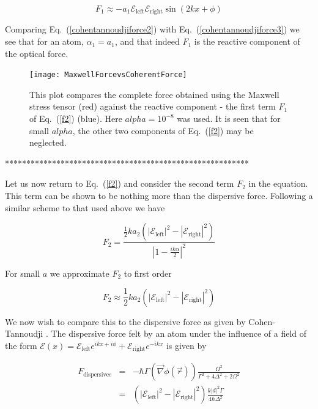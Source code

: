 \documentclass[twocolumn,english,pra,aps,superscriptaddress,floatfix]{revtex4-1}
\begin{document}
\begin{equation}
F_{1}\approx-a_{1} \mathcal{E}_{\mathrm{left}}\mathcal{E}_{\mathrm{right}}\sin\left(2kx+\phi\right)
\label{cohentannoudjiforce3}
\end{equation}

Comparing Eq.\ (\ref{cohentannoudjiforce2}) with Eq.\ (\ref{cohentannoudjiforce3}) we see that for an atom, $\alpha_{1}=a_{1}$, and that indeed $F_{1}$ is the reactive component of the optical force. 

\begin{figure}
\texttt{[image: MaxwellForcevsCoherentForce]}
\caption{This plot compares the complete force obtained using the Maxwell stress tensor (red) against the reactive component - the first term $F_{1}$ of Eq.\ (\ref{f2}) (blue).  Here $alpha=10^{-8}$ was used.  It is seen that for small $alpha$, the other two components of Eq.\ (\ref{f2}) may be neglected.}
\label{fig:forcecompare}
\end{figure}
*********************************************************

 Let us now return to Eq.\ (\ref{f2}) and consider the second term $F_{2}$ in the equation.  This term can be shown to be nothing more than the dispersive force.  Following a similar scheme to that used above we have 


\begin{equation}
F_{2}=\frac{\frac{1}{2}ka_{2}\left(\left|\mathcal{E}_{\mathrm{left}}\right|^{2}-\left|\mathcal{E}_{\mathrm{right}}\right|^{2}\right)}{\left|1-\frac{ik\alpha}{2}\right|^{2}}
\label{secondforce1}
\end{equation}

For small $a$ we approximate $F_{2}$ to first order

\begin{equation}
F_{2}\approx\frac{1}{2}ka_{2}\left(\left|\mathcal{E}_{\mathrm{left}}\right|^{2}-\left|\mathcal{E}_{\mathrm{right}}\right|^{2}\right)
\label{secondforce2}
\end{equation}

We now wish to compare this to the dispersive force as given by Cohen-Tannoudji \cite{cohentannoudji}. The dispersive force felt by an atom under the influence of a field
of the form $\mathcal{E}(x)=\mathcal{E}_{\mathrm{left}}e^{ikx+i\phi}+\mathcal{E}_{\mathrm{right}}e^{-ikx}$ is given by

\begin{eqnarray}
F_{\mathrm{dispersive}e}&=&-\hbar\Gamma\left(\overrightarrow{\nabla}\phi(\overrightarrow{r})\right)\frac{\Omega^{2}}{\Gamma^{2}+4\Delta^{2}+2\Omega^{2}} \nonumber \\
&=&\left(\left|\mathcal{E}_{\mathrm{left}}\right|^{2}-\left|\mathcal{E}_{\mathrm{right}}\right|^{2}\right)\frac{k\left|d\right|^{2}\Gamma}{4\hbar\Delta^{2}}
\label{dispersive1}
\end{eqnarray}
\end{document}

